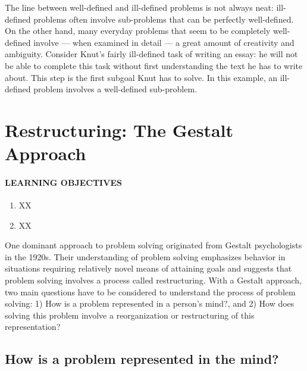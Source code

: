 \documentclass[
]{krantz}
\providecommand{\tightlist}{%
  \setlength{\itemsep}{0pt}\setlength{\parskip}{0pt}}
\begin{document}
The line between well-defined and ill-defined problems is not always neat: ill-defined problems often involve sub-problems that can be perfectly well-defined. On the other hand, many everyday problems that seem to be completely well-defined involve --- when examined in detail --- a great amount of creativity and ambiguity. Consider Knut's fairly ill-defined task of writing an essay: he will not be able to complete this task without first understanding the text he has to write about. This step is the first subgoal Knut has to solve. In this example, an ill-defined problem involves a well-defined sub-problem.

\hypertarget{restructuring-the-gestalt-approach}{%
\section{Restructuring: The Gestalt Approach}\label{restructuring-the-gestalt-approach}}

\hypertarget{learning-objectives-9}{%
\paragraph*{LEARNING OBJECTIVES}\label{learning-objectives-9}}

\begin{enumerate}
\def\labelenumi{\arabic{enumi}.}
\tightlist
\item
  XX
\item
  XX
\end{enumerate}

One dominant approach to problem solving originated from Gestalt psychologists in the 1920s. Their understanding of problem solving emphasizes behavior in situations requiring relatively novel means of attaining goals and suggests that problem solving involves a process called restructuring. With a Gestalt approach, two main questions have to be considered to understand the process of problem solving: 1) How is a problem represented in a person's mind?, and 2) How does solving this problem involve a reorganization or restructuring of this representation?

\hypertarget{how-is-a-problem-represented-in-the-mind}{%
\subsection*{How is a problem represented in the mind?}\label{how-is-a-problem-represented-in-the-mind}}
\end{document}
